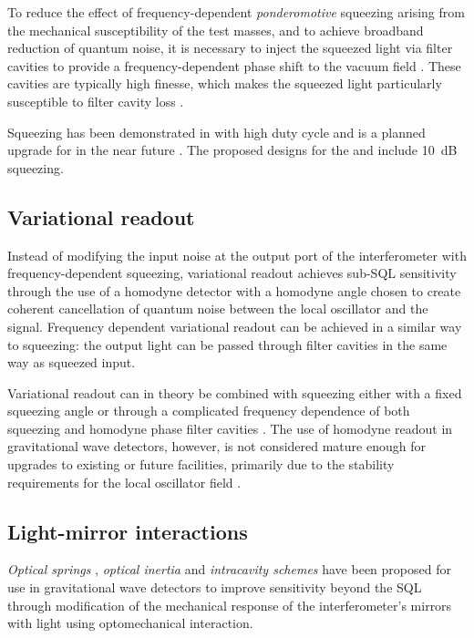 To reduce the effect of frequency-dependent \emph{ponderomotive} squeezing arising from the mechanical susceptibility of the test masses, and to achieve broadband reduction of quantum noise, it is necessary to inject the squeezed light via filter cavities to provide a frequency-dependent phase shift to the vacuum field \cite{Kimble2001}. These cavities are typically high finesse, which makes the squeezed light particularly susceptible to filter cavity loss \cite{Kwee2014}.

Squeezing has been demonstrated in \GEO{} with high duty cycle \cite{Grote2013} and is a planned upgrade for \ALIGO{} in the near future \cite{Miller2015}. The proposed designs for the \ET{} and \LIGOCE{} include \SI{10}{\deci\bel} squeezing.

\subsection{Variational readout}
Instead of modifying the input noise at the output port of the interferometer with frequency-dependent squeezing, variational readout achieves sub-\gls{SQL} sensitivity through the use of a homodyne detector with a homodyne angle chosen to create coherent cancellation of quantum noise between the local oscillator and the signal. Frequency dependent variational readout can be achieved in a similar way to squeezing: the output light can be passed through filter cavities in the same way as squeezed input.

Variational readout can in theory be combined with squeezing either with a fixed squeezing angle \cite{Buonanno2004} or through a complicated frequency dependence of both squeezing and homodyne phase filter cavities \cite{Harms2003}. The use of homodyne readout in gravitational wave detectors, however, is not considered mature enough for upgrades to existing or future facilities, primarily due to the stability requirements for the local oscillator field \cite{Steinlechner2015}.

\subsection{Light-mirror interactions}
\emph{Optical springs} \cite{Braginsky1999, Buonanno2002, Corbitt2007, Rehbein2008, Gordon2015}, \emph{optical inertia} \cite{Khalili2011, Voronchev2012} and \emph{intracavity schemes} \cite{Braginsky1997, Khalili2002, Danilishin2006} have been proposed for use in gravitational wave detectors to improve sensitivity beyond the \gls{SQL} through modification of the mechanical response of the interferometer's mirrors with light using optomechanical interaction.

